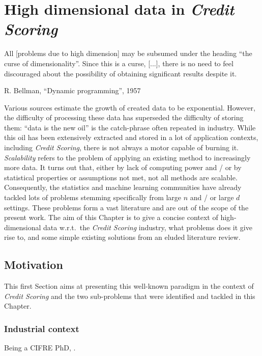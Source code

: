 \chapter{High dimensional data in \textit{Credit Scoring}} \label{chap7}


\epigraph{All [problems due to high dimension] may be subsumed under the heading “the curse of dimensionality”. Since this is a curse, [...], there is no need to feel discouraged about the possibility of obtaining significant results despite it.}{R. Bellman, ``Dynamic programming'', 1957}

\minitoc

Various sources estimate the growth of created data to be exponential. However, the difficulty of processing these data has superseded the difficulty of storing them: ``data is the new oil'' is the catch-phrase often repeated in industry. While this oil has been extensively extracted and stored in a lot of application contexts, including \textit{Credit Scoring}, there is not always a motor capable of burning it. \textit{Scalability} refers to the problem of applying an existing method to increasingly more data. It turns out that, either by lack of computing power and / or by statistical properties or assumptions not met, not all methods are scalable.
Consequently, the statistics and machine learning communities have already tackled lots of problems stemming specifically from large $n$ and / or large $d$ settings.
These problems form a vast literature and are out of the scope of the present work.
The aim of this Chapter is to give a concise context of high-dimensional data w.r.t.\ the \textit{Credit Scoring} industry, what problems does it give rise to, and some simple existing solutions from an eluded literature review.

\section{Motivation}

This first Section aims at presenting this well-known paradigm in the context of \textit{Credit Scoring} and the two sub-problems that were identified and tackled in this Chapter.

\subsection{Industrial context}

Being a CIFRE PhD, .

